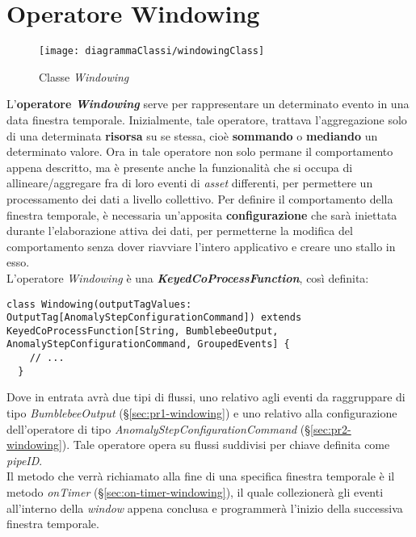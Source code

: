 
\section{Operatore Windowing}\label{sec:windowing}
\begin{figure}[H] 
    \centering 
    \texttt{[image: diagrammaClassi/windowingClass]} 
    \caption{Classe \textit{Windowing}}
\end{figure}
L'\textbf{operatore \textit{Windowing}} serve per rappresentare un determinato evento in una data finestra temporale. Inizialmente, tale operatore, trattava l'aggregazione solo di una determinata \textbf{risorsa} su se stessa, cioè \textbf{sommando} o \textbf{mediando} un determinato valore. Ora in tale operatore non solo permane il comportamento appena descritto, ma è presente anche la funzionalità che si occupa di allineare/aggregare fra di loro eventi di \textit{asset} differenti, per permettere un processamento dei dati a livello collettivo. Per definire il comportamento della finestra temporale, è necessaria un'apposita \textbf{configurazione} che sarà iniettata durante l'elaborazione attiva dei dati, per permetterne la modifica del comportamento senza dover riavviare l'intero applicativo e creare uno stallo in esso.\\
L'operatore \textit{Windowing} è una \textbf{\textit{KeyedCoProcessFunction}}, così definita:
\begin{verbatim}
class Windowing(outputTagValues: OutputTag[AnomalyStepConfigurationCommand]) extends KeyedCoProcessFunction[String, BumblebeeOutput, AnomalyStepConfigurationCommand, GroupedEvents] {
	// ...
  }
\end{verbatim}
Dove in entrata avrà due tipi di flussi, uno relativo agli eventi da raggruppare di tipo \textit{BumblebeeOutput} (\S\ref{sec:pr1-windowing}) e uno relativo alla configurazione dell'operatore di tipo \textit{AnomalyStepConfigurationCommand} (\S\ref{sec:pr2-windowing}). Tale operatore opera su flussi suddivisi per chiave definita come \textit{pipeID}.\\
Il metodo che verrà richiamato alla fine di una specifica finestra temporale è il metodo \textit{onTimer} (\S\ref{sec:on-timer-windowing}), il quale collezionerà gli eventi all'interno della \textit{window} appena conclusa e programmerà l'inizio della successiva finestra temporale.

